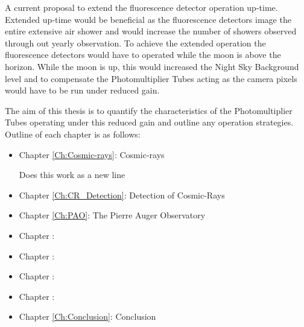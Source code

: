 A current proposal to extend the fluorescence detector operation up-time. Extended up-time would be beneficial as the fluorescence detectors image the entire extensive air shower and would increase the number of showers observed through out yearly observation. To achieve the extended operation the fluorescence detectors would have to operated while the moon is above the horizon. While the moon is up, this would increased the Night Sky Background level and to compensate the Photomultiplier Tubes acting as the camera pixels would have to be run under reduced gain. 

The aim of this thesis is to quantify the characteristics of the Photomultiplier Tubes operating under this reduced gain and outline any operation strategies. Outline of each chapter is as follows:

\begin{itemize}
\item  Chapter \ref{Ch:Cosmic-rays}: Cosmic-rays

Does this work as a new line

\item Chapter \ref{Ch:CR_Detection}: Detection of Cosmic-Rays

\item Chapter \ref{Ch:PAO}: The Pierre Auger Observatory

\item Chapter : 

\item Chapter : 

\item Chapter : 

\item Chapter : 

\item Chapter \ref{Ch:Conclusion}: Conclusion 


\end{itemize}